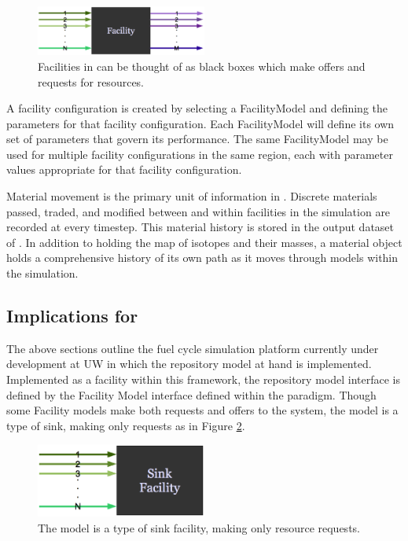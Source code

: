 \begin{figure}[htb!]
  \begin{center}
    \includegraphics[width=0.5\textwidth]{./chapters/paradigm/facility.eps}
  \end{center}
  \caption{Facilities in \Cyclus can be thought of as black boxes which make 
  offers and requests for resources.}
  \label{fig:facility}
\end{figure}


A facility configuration is created by selecting a FacilityModel and 
defining the parameters for that facility configuration.
Each FacilityModel will define its own set of parameters that 
govern its performance.  The same FacilityModel may be used for 
multiple facility configurations in the same region, each with 
parameter values appropriate for that facility configuration.



Material movement is the primary unit of information in \Cyclus.  
Discrete materials passed, traded, and modified between and within facilities 
in the simulation are recorded at every timestep.  This material 
history is stored in the output dataset of \Cyclus. In addition to 
holding the map of isotopes and their masses, a material object holds 
a comprehensive history of its own path as it moves through models 
within the simulation. 

\subsection{Implications for \Cyder}

The above sections outline the fuel cycle simulation platform
currently under development at \gls{UW} in which the \Cyder repository model
at hand is implemented.  Implemented as a facility within this 
framework, the repository model interface is defined by the Facility
Model interface defined within the \Cyclus paradigm. Though some Facility 
models make both requests and offers to the system, the \Cyder model is a type 
of sink, making only requests as in Figure \ref{fig:sinkfacility}.

\begin{figure}[htb!]
  \begin{center}
    \includegraphics[width=0.5\textwidth]{./chapters/paradigm/sinkfacility.eps}
  \end{center}
  \caption{The \Cyder model is a type of sink facility, making only resource requests.}
  \label{fig:sinkfacility}
\end{figure}

